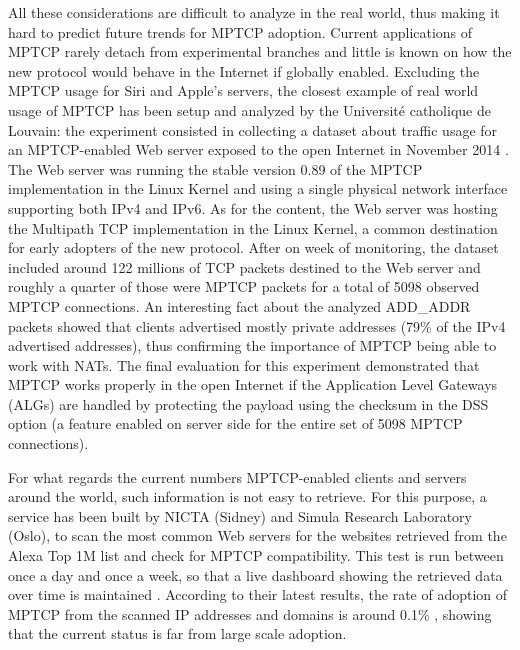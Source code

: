 All these considerations are difficult to analyze in the real world, thus making it hard to predict future trends for MPTCP adoption. Current applications of MPTCP rarely detach from experimental branches and little is known on how the new protocol would behave in the Internet if globally enabled. Excluding the MPTCP usage for Siri and Apple's servers, the closest example of real world usage of MPTCP has been setup and analyzed by the Université catholique de Louvain: the experiment consisted in collecting a dataset about traffic usage for an MPTCP-enabled Web server exposed to the open Internet in November 2014 \cite{HTSB15}. The Web server was running the stable version 0.89 of the MPTCP implementation in the Linux Kernel and using a single physical network interface supporting both IPv4 and IPv6. As for the content, the Web server was hosting the Multipath TCP implementation in the Linux Kernel, a common destination for early adopters of the new protocol. After on week of monitoring, the dataset included around 122 millions of TCP packets destined to the Web server and roughly a quarter of those were MPTCP packets for a total of 5098 observed MPTCP connections.
An interesting fact about the analyzed ADD\_ADDR packets showed that clients advertised mostly private addresses (79\% of the IPv4 advertised addresses), thus confirming the importance of MPTCP being able to work with NATs.
The final evaluation for this experiment demonstrated that MPTCP works properly in the open Internet if the Application Level Gateways (ALGs) are handled by protecting the payload using the checksum in the DSS option (a feature enabled on server side for the entire set of 5098 MPTCP connections).

For what regards the current numbers MPTCP-enabled clients and servers around the world, such information is not easy to retrieve. For this purpose, a service has been built by NICTA (Sidney) and Simula Research Laboratory (Oslo), to scan the most common Web servers for the websites retrieved from the Alexa Top 1M list and check for MPTCP compatibility. This test is run between once a day and once a week, so that a live dashboard showing the retrieved data over time is maintained \cite{dashboard}. According to their latest results, the rate of adoption of MPTCP from the scanned IP addresses and domains is around 0.1\% \cite{Mehani:2015:ELM:2798087.2798088}, showing that the current status is far from large scale adoption.

